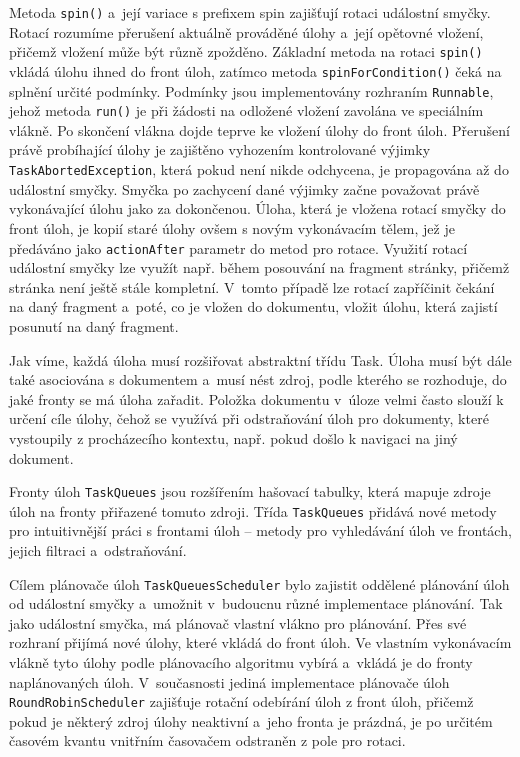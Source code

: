 Metoda \texttt{spin()} a~její variace s prefixem spin zajišťují rotaci událostní smyčky. Rotací rozumíme přerušení aktuálně prováděné úlohy a~její opětovné vložení, přičemž vložení může být různě zpožděno. Základní metoda na rotaci \texttt{spin()} vkládá úlohu ihned do front úloh, zatímco metoda \texttt{spinForCondition()} čeká na splnění určité podmínky. Podmínky jsou implementovány rozhraním \texttt{Runnable}, jehož metoda \texttt{run()} je při žádosti na odložené vložení zavolána ve speciálním vlákně. Po skončení vlákna dojde teprve ke vložení úlohy do front úloh. Přerušení právě probíhající úlohy je zajištěno vyhozením kontrolované výjimky \texttt{TaskAbortedException}, která pokud není nikde odchycena, je propagována až do událostní smyčky. Smyčka po zachycení dané výjimky začne považovat právě vykonávající úlohu jako za dokončenou. Úloha, která je vložena rotací smyčky do front úloh, je kopií staré úlohy ovšem s novým vykonávacím tělem, jež je předáváno jako \texttt{actionAfter} parametr do metod pro rotace. Využití rotací událostní smyčky lze využít např. během posouvání na fragment stránky, přičemž stránka není ještě stále kompletní. V~tomto případě lze rotací zapříčinit čekání na daný fragment a~poté, co je vložen do dokumentu, vložit úlohu, která zajistí posunutí na daný fragment.

Jak víme, každá úloha musí rozšiřovat abstraktní třídu Task. Úloha musí být dále také asociována s dokumentem a~musí nést zdroj, podle kterého se rozhoduje, do jaké fronty se má úloha zařadit. Položka dokumentu v~úloze velmi často slouží k určení cíle úlohy, čehož se využívá při odstraňování úloh pro dokumenty, které vystoupily z procházecího kontextu, např. pokud došlo k navigaci na jiný dokument. 

Fronty úloh \texttt{TaskQueues} jsou rozšířením hašovací tabulky, která mapuje zdroje úloh na fronty přiřazené tomuto zdroji. Třída \texttt{TaskQueues} přidává nové metody pro intuitivnější práci s frontami úloh -- metody pro vyhledávání úloh ve frontách, jejich filtraci a~odstraňování.

Cílem plánovače úloh \texttt{TaskQueuesScheduler} bylo zajistit oddělené plánování úloh od událostní smyčky a~umožnit v~budoucnu různé implementace plánování. Tak jako událostní smyčka, má plánovač vlastní vlákno pro plánování. Přes své rozhraní přijímá nové úlohy, které vkládá do front úloh. Ve vlastním vykonávacím vlákně tyto úlohy podle plánovacího algoritmu vybírá a~vkládá je do fronty naplánovaných úloh. V~současnosti jediná implementace plánovače úloh \texttt{RoundRobinScheduler} zajišťuje rotační odebírání úloh z front úloh, přičemž pokud je některý zdroj úlohy neaktivní a~jeho fronta je prázdná, je po určitém časovém kvantu vnitřním časovačem odstraněn z pole pro rotaci.

